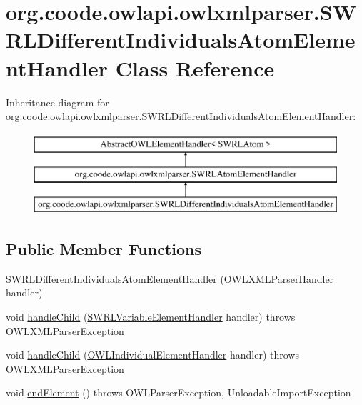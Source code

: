 \hypertarget{classorg_1_1coode_1_1owlapi_1_1owlxmlparser_1_1_s_w_r_l_different_individuals_atom_element_handler}{\section{org.\-coode.\-owlapi.\-owlxmlparser.\-S\-W\-R\-L\-Different\-Individuals\-Atom\-Element\-Handler Class Reference}
\label{classorg_1_1coode_1_1owlapi_1_1owlxmlparser_1_1_s_w_r_l_different_individuals_atom_element_handler}
}
Inheritance diagram for org.\-coode.\-owlapi.\-owlxmlparser.\-S\-W\-R\-L\-Different\-Individuals\-Atom\-Element\-Handler\-:\begin{figure}[H]
\begin{center}
\leavevmode
\includegraphics[height=3.000000cm]{classorg_1_1coode_1_1owlapi_1_1owlxmlparser_1_1_s_w_r_l_different_individuals_atom_element_handler}
\end{center}
\end{figure}
\subsection*{Public Member Functions}
\begin{DoxyCompactItemize}
\item 
\hyperlink{classorg_1_1coode_1_1owlapi_1_1owlxmlparser_1_1_s_w_r_l_different_individuals_atom_element_handler_a0e77f3a0df1237d5f1fb1d95160c8090}{S\-W\-R\-L\-Different\-Individuals\-Atom\-Element\-Handler} (\hyperlink{classorg_1_1coode_1_1owlapi_1_1owlxmlparser_1_1_o_w_l_x_m_l_parser_handler}{O\-W\-L\-X\-M\-L\-Parser\-Handler} handler)
\item 
void \hyperlink{classorg_1_1coode_1_1owlapi_1_1owlxmlparser_1_1_s_w_r_l_different_individuals_atom_element_handler_a9cc18f8ebf5d82cf7699571e46d1a26b}{handle\-Child} (\hyperlink{classorg_1_1coode_1_1owlapi_1_1owlxmlparser_1_1_s_w_r_l_variable_element_handler}{S\-W\-R\-L\-Variable\-Element\-Handler} handler)  throws O\-W\-L\-X\-M\-L\-Parser\-Exception 
\item 
void \hyperlink{classorg_1_1coode_1_1owlapi_1_1owlxmlparser_1_1_s_w_r_l_different_individuals_atom_element_handler_a72cb6532fb0ca2da6eb2d5a9db591833}{handle\-Child} (\hyperlink{classorg_1_1coode_1_1owlapi_1_1owlxmlparser_1_1_o_w_l_individual_element_handler}{O\-W\-L\-Individual\-Element\-Handler} handler)  throws O\-W\-L\-X\-M\-L\-Parser\-Exception 
\item 
void \hyperlink{classorg_1_1coode_1_1owlapi_1_1owlxmlparser_1_1_s_w_r_l_different_individuals_atom_element_handler_ab7f2a2d60866b092f9ee9ac828d8e26d}{end\-Element} ()  throws O\-W\-L\-Parser\-Exception, Unloadable\-Import\-Exception 
\end{DoxyCompactItemize}
